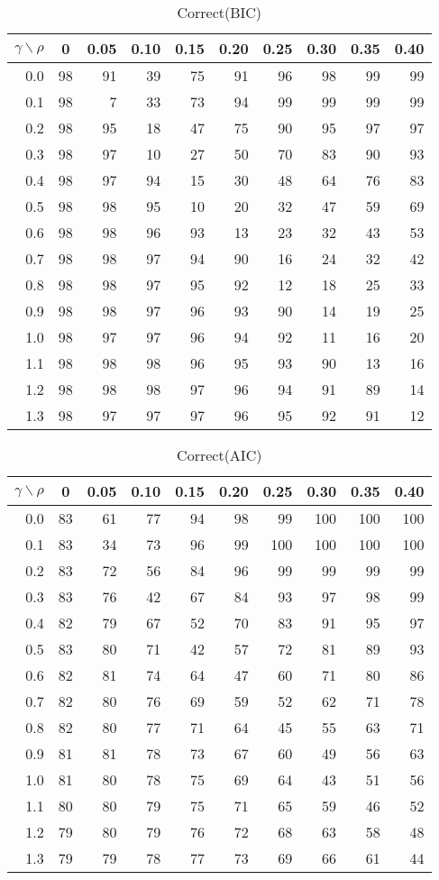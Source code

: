 \documentclass[12pt]{article}
\begin{document}
\begin{table}[!tbp]
\caption{Correct(BIC)}
 \begin{center}
 \begin{tabular}{r|rrrrrrrrr}\hline\hline
\multicolumn{1}{c|}{$\gamma\backslash\rho$}&\multicolumn{1}{c}{0}&\multicolumn{1}{c}{0.05}&\multicolumn{1}{c}{0.10}&\multicolumn{1}{c}{0.15}&\multicolumn{1}{c}{0.20}&\multicolumn{1}{c}{0.25}&\multicolumn{1}{c}{0.30}&\multicolumn{1}{c}{0.35}&\multicolumn{1}{c}{0.40}\tabularnewline
\hline




0.0&98&91&39&75&91&96&98&99&99\tabularnewline
0.1&98& 7&33&73&94&99&99&99&99\tabularnewline
0.2&98&95&18&47&75&90&95&97&97\tabularnewline
0.3&98&97&10&27&50&70&83&90&93\tabularnewline
0.4&98&97&94&15&30&48&64&76&83\tabularnewline
0.5&98&98&95&10&20&32&47&59&69\tabularnewline
0.6&98&98&96&93&13&23&32&43&53\tabularnewline
0.7&98&98&97&94&90&16&24&32&42\tabularnewline
0.8&98&98&97&95&92&12&18&25&33\tabularnewline
0.9&98&98&97&96&93&90&14&19&25\tabularnewline
1.0&98&97&97&96&94&92&11&16&20\tabularnewline
1.1&98&98&98&96&95&93&90&13&16\tabularnewline
1.2&98&98&98&97&96&94&91&89&14\tabularnewline
1.3&98&97&97&97&96&95&92&91&12\tabularnewline
\hline
\end{tabular}

\end{center}

\end{table}

%


\begin{table}[!tbp]
\caption{Correct(AIC)}
 \begin{center}
 \begin{tabular}{r|rrrrrrrrr}\hline\hline
\multicolumn{1}{c|}{$\gamma\backslash\rho$}&\multicolumn{1}{c}{0}&\multicolumn{1}{c}{0.05}&\multicolumn{1}{c}{0.10}&\multicolumn{1}{c}{0.15}&\multicolumn{1}{c}{0.20}&\multicolumn{1}{c}{0.25}&\multicolumn{1}{c}{0.30}&\multicolumn{1}{c}{0.35}&\multicolumn{1}{c}{0.40}\tabularnewline
\hline




0.0&83&61&77&94&98& 99&100&100&100\tabularnewline
0.1&83&34&73&96&99&100&100&100&100\tabularnewline
0.2&83&72&56&84&96& 99& 99& 99& 99\tabularnewline
0.3&83&76&42&67&84& 93& 97& 98& 99\tabularnewline
0.4&82&79&67&52&70& 83& 91& 95& 97\tabularnewline
0.5&83&80&71&42&57& 72& 81& 89& 93\tabularnewline
0.6&82&81&74&64&47& 60& 71& 80& 86\tabularnewline
0.7&82&80&76&69&59& 52& 62& 71& 78\tabularnewline
0.8&82&80&77&71&64& 45& 55& 63& 71\tabularnewline
0.9&81&81&78&73&67& 60& 49& 56& 63\tabularnewline
1.0&81&80&78&75&69& 64& 43& 51& 56\tabularnewline
1.1&80&80&79&75&71& 65& 59& 46& 52\tabularnewline
1.2&79&80&79&76&72& 68& 63& 58& 48\tabularnewline
1.3&79&79&78&77&73& 69& 66& 61& 44\tabularnewline
\hline
\end{tabular}

\end{center}

\end{table}
\end{document}
